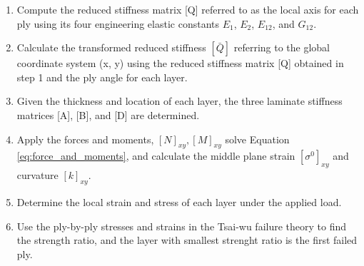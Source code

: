 \begin{enumerate}
\item Compute the reduced stiffness matrix [Q] referred to as the local axis for each ply using its
	four engineering elastic constants $E_1 $, $E_2 $, $E_{12} $, and $G_{12} $.

\item Calculate the transformed reduced stiffness $[\bar{Q}] $ referring to the global coordinate
	system (x, y) using the reduced stiffness matrix [Q] obtained in step 1 and the ply angle for
	each layer.

\item  Given the thickness and location of each layer, the three laminate stiffness matrices [A],
	[B], and [D] are determined.

\item  Apply the forces and moments, $[N]_{xy}, [M]_{xy} $ solve Equation
	\ref{eq:force_and_moments}, and calculate the middle plane strain $[\sigma ^{0}]_{xy} $ and
	curvature $[k]_{xy} $.

\item Determine the local strain and stress of each layer under the applied load.

\item  Use the ply-by-ply stresses and strains in the Tsai-wu failure theory to find the strength
	ratio, and the layer with smallest strenght ratio is the first failed ply. 
\end{enumerate}
